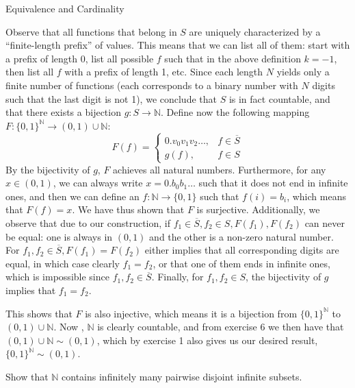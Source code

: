 \begin{section}{Equivalence and Cardinality}
\begin{solution}
    Observe that all functions that belong in $S$ are uniquely characterized by a ``finite-length prefix'' of values.
    This means that we can list all of them: start with a prefix of length 0, list all possible $f$ such that in the above definition $k = -1$, then list all $f$ with a prefix of length 1, etc.
    Since each length $N$ yields only a finite number of functions (each corresponds to a binary number with $N$ digits such that the last digit is not 1), we conclude that $S$ is in fact countable, and that there exists a bijection $g: S \rightarrow \mathbb{N}$.
    Define now the following mapping $F: \{0, 1\}^{\mathbb{N}} \rightarrow (0, 1) \cup \mathbb{N}$:
    $$F(f) = \begin{cases}
        0.v_0v_1v_2\ldots, & f \in \overline{S} \\
        g(f), & f \in S
    \end{cases}$$
    By the bijectivity of $g$, $F$ achieves all natural numbers.
    Furthermore, for any $x \in (0, 1)$, we can always write $x = 0.b_0b_1\ldots$ such that it does not end in infinite ones, and then we can define an $f: \mathbb{N} \rightarrow \{0, 1\}$ such that $f(i) = b_i$, which means that $F(f) = x$.
    We have thus shown that $F$ is surjective.
    Additionally, we observe that due to our construction, if $f_1 \in \overline{S}, f_2 \in S, F(f_1), F(f_2)$ can never be equal: one is always in $(0, 1)$ and the other is a non-zero natural number.
    For $f_1, f_2 \in \overline{S}, F(f_1) = F(f_2)$ either implies that all corresponding digits are equal, in which case clearly $f_1 = f_2$, or that one of them ends in infinite ones, which is impossible since $f_1, f_2 \in \overline{S}$.
    Finally, for $f_1, f_2 \in S$, the bijectivity of $g$ implies that $f_1 = f_2$.

    This shows that $F$ is also injective, which means it is a bijection from $\{0, 1\}^{\mathbb{N}}$ to $(0, 1) \cup \mathbb{N}$.
    Now , $\mathbb{N}$ is clearly countable, and from exercise 6 we then have that $(0, 1) \cup \mathbb{N} \sim (0, 1)$, which by exercise 1 also gives us our desired result, $\{0, 1\}^{\mathbb{N}} \sim (0, 1)$.

\end{solution}

\begin{exercise}{13}
    Show that $\mathbb{N}$ contains infinitely many pairwise disjoint infinite subsets.
\end{exercise}

\begin{solution}


\end{solution}
\end{section}
